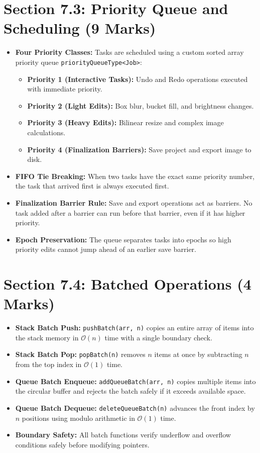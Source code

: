 \documentclass[10pt,a4paper]{article}
\begin{document}
\section{Section 7.3: Priority Queue and Scheduling (9 Marks)}
\begin{itemize}
    \item \textbf{Four Priority Classes:} Tasks are scheduled using a custom sorted array priority queue \texttt{priorityQueueType<Job>}:
    \begin{itemize}
        \item \textbf{Priority 1 (Interactive Tasks):} Undo and Redo operations executed with immediate priority.
        \item \textbf{Priority 2 (Light Edits):} Box blur, bucket fill, and brightness changes.
        \item \textbf{Priority 3 (Heavy Edits):} Bilinear resize and complex image calculations.
        \item \textbf{Priority 4 (Finalization Barriers):} Save project and export image to disk.
    \end{itemize}
    \item \textbf{FIFO Tie Breaking:} When two tasks have the exact same priority number, the task that arrived first is always executed first.
    \item \textbf{Finalization Barrier Rule:} Save and export operations act as barriers. No task added after a barrier can run before that barrier, even if it has higher priority.
    \item \textbf{Epoch Preservation:} The queue separates tasks into epochs so high priority edits cannot jump ahead of an earlier save barrier.
\end{itemize}

\section{Section 7.4: Batched Operations (4 Marks)}
\begin{itemize}
    \item \textbf{Stack Batch Push:} \texttt{pushBatch(arr, n)} copies an entire array of items into the stack memory in $\mathcal{O}(n)$ time with a single boundary check.
    \item \textbf{Stack Batch Pop:} \texttt{popBatch(n)} removes $n$ items at once by subtracting $n$ from the top index in $\mathcal{O}(1)$ time.
    \item \textbf{Queue Batch Enqueue:} \texttt{addQueueBatch(arr, n)} copies multiple items into the circular buffer and rejects the batch safely if it exceeds available space.
    \item \textbf{Queue Batch Dequeue:} \texttt{deleteQueueBatch(n)} advances the front index by $n$ positions using modulo arithmetic in $\mathcal{O}(1)$ time.
    \item \textbf{Boundary Safety:} All batch functions verify underflow and overflow conditions safely before modifying pointers.
\end{itemize}
\end{document}

